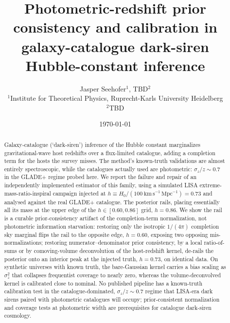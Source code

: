 \documentclass[usenatbib]{mnras}
\title[Photometric-redshift prior consistency and calibration in galaxy-catalogue dark-siren Hubble-constant inference]{Photometric-redshift prior consistency and calibration in galaxy-catalogue dark-siren Hubble-constant inference}
\author[Jasper Seehofer, TBD]{
Jasper Seehofer$^{1}$, TBD$^{2}$\\
$^{1}$Institute for Theoretical Physics, Ruprecht-Karls University Heidelberg\\
$^{2}$TBD\\
}
\begin{document}
\date{\today}

\maketitle

\begin{abstract}
Galaxy-catalogue (`dark-siren') inference of the Hubble constant
marginalizes gravitational-wave host redshifts over a flux-limited
catalogue, adding a completion term for the hosts the survey misses.
The method's known-truth validations are almost entirely
spectroscopic, while the catalogues actually used are photometric:
$\sigma_z/z \sim 0.7$ in the GLADE+ regime probed here. %
We report the failure and repair of an independently implemented
estimator of this family, using a simulated LISA
extreme-mass-ratio-inspiral campaign injected at
$h \equiv H_0/(100~\mathrm{km\,s^{-1}\,Mpc^{-1}}) = 0.73$ %
and analysed against the real GLADE+ catalogue.  The posterior rails,
placing essentially all its mass at the upper edge of the
$h \in [0.60, 0.86]$ grid, $h = 0.86$. %
We show the rail is a curable prior-consistency artifact of the
completion-term normalization, not photometric information starvation:
restoring only the isotropic $1/(4\pi)$ completion sky marginal flips
the rail to the opposite edge, $h = 0.60$, exposing two opposing
mis-normalizations; %
restoring numerator--denominator prior consistency, by a local
ratio-of-sums or by comoving-volume deconvolution of the host-redshift
kernel, de-rails the posterior onto an interior peak at the injected
truth, $h = 0.73$, on identical data. %
On synthetic universes with known truth, the bare-Gaussian kernel
carries a bias scaling as $\sigma_z^2$ that collapses frequentist
coverage to nearly zero, whereas the volume-deconvolved kernel is
calibrated close to nominal. %
No published pipeline has a known-truth calibration test in the
catalogue-dominated, $\sigma_z/z \sim 0.7$ regime %
that LISA-era dark sirens paired with photometric catalogues will
occupy; prior-consistent normalization and coverage tests at
photometric width are prerequisites for catalogue dark-siren
cosmology.
\end{abstract}
\end{document}
